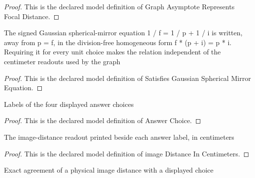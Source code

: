 \begin{proof}
  This is the declared model definition of Graph Asymptote Represents Focal Distance.
\end{proof}
\begin{definition}
  \label{def:physics:phyx-mini-0442:phyxminiproblems-problemphyxmini0442-satisfiesgaussiansphericalmirrorequation}
  The signed Gaussian spherical-mirror equation 1 / f = 1 / p + 1 / i is written, away from p = f, in the division-free homogeneous form f * (p + i) = p * i. Requiring it for every unit choice makes the relation independent of the centimeter readouts used by the graph
\end{definition}
\begin{proof}
  This is the declared model definition of Satisfies Gaussian Spherical Mirror Equation.
\end{proof}
\begin{definition}
  \label{def:physics:phyx-mini-0442:phyxminiproblems-problemphyxmini0442-answerchoice}
  Labels of the four displayed answer choices
\end{definition}
\begin{proof}
  This is the declared model definition of Answer Choice.
\end{proof}
\begin{definition}
  \label{def:physics:phyx-mini-0442:phyxminiproblems-problemphyxmini0442-answerchoice-imagedistanceincentimeters}
  The image-distance readout printed beside each answer label, in centimeters
\end{definition}
\begin{proof}
  This is the declared model definition of image Distance In Centimeters.
\end{proof}
\begin{definition}
  \label{def:physics:phyx-mini-0442:phyxminiproblems-problemphyxmini0442-matchesanswerchoice}
  Exact agreement of a physical image distance with a displayed choice
\end{definition}
